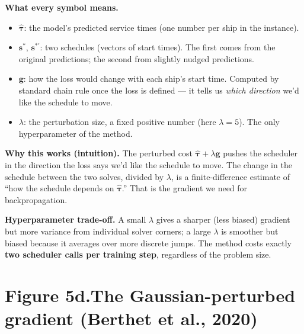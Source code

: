 \documentclass[11pt]{article}
\begin{document}
\noindent
\textbf{What every symbol means.}
\begin{itemize}\setlength{\itemsep}{0pt}
  \item $\hat{\boldsymbol{\tau}}$: the model's predicted service times
        (one number per ship in the instance).
  \item $\boldsymbol{s}^{\ast}$, $\boldsymbol{s}^{\ast \prime}$: two
        schedules (vectors of start times). The first comes from the
        original predictions; the second from slightly nudged
        predictions.
  \item $\boldsymbol{g}$: how the loss would change with each ship's
        start time. Computed by standard chain rule once the loss is
        defined --- it tells us \emph{which direction} we'd like the
        schedule to move.
  \item $\lambda$: the perturbation size, a fixed positive number
        (here $\lambda = 5$). The only hyperparameter of the method.
\end{itemize}

\noindent
\textbf{Why this works (intuition).} The perturbed cost
$\hat{\boldsymbol{\tau}} + \lambda \boldsymbol{g}$ pushes the
scheduler in the direction the loss says we'd like the schedule to
move. The change in the schedule between the two solves, divided by
$\lambda$, is a finite-difference estimate of ``how the schedule
depends on $\hat{\boldsymbol{\tau}}$.'' That is the gradient we need
for backpropagation.

\noindent
\textbf{Hyperparameter trade-off.} A small $\lambda$ gives a sharper
(less biased) gradient but more variance from individual solver
corners; a large $\lambda$ is smoother but biased because it averages
over more discrete jumps. The method costs exactly \textbf{two
scheduler calls per training step}, regardless of the problem size.


\newpage

\section*{Figure 5d.\quad The Gaussian-perturbed gradient (Berthet et al., 2020)}
\end{document}
